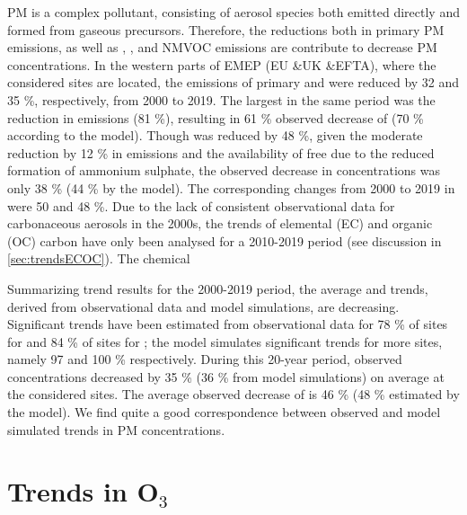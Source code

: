 PM is a complex pollutant, consisting of aerosol species both emitted
directly and formed from gaseous precursors. Therefore, the reductions both in primary PM emissions, as well as \sox, \noii, \nhiii and NMVOC emissions are contribute to decrease PM concentrations. In the western parts of EMEP (EU \&UK \&EFTA), where the considered sites are located, the emissions of primary \PM[10] and \PM[2.5] were reduced by 32 and 35 \%, respectively, from 2000 to 2019. The largest in the same period was the reduction in \sox emissions (81 \%), resulting in 61 \% observed decrease of \soiv (70 \% according to the model). Though \noii was reduced by 48 \%, given the moderate reduction by 12 \% in \nhiii emissions and the availability of free \nhiii due to the reduced formation of ammonium sulphate, the observed decrease in \noiii concentrations was only 38 \% (44 \% by the model). The corresponding changes from 2000 to 2019 in \nhiv were 50 and 48 \%. Due to the lack of consistent observational data for carbonaceous aerosols in the 2000s, the trends of elemental (EC) and organic (OC) carbon have only been analysed for a 2010-2019 period (see discussion in \ref{sec:trendsECOC}). The chemical  

Summarizing trend results for the 2000-2019 period, the average \PM[10] and \PM[2.5] trends, derived from observational data and model simulations, are decreasing. Significant trends have been estimated from observational data for 78 \% of sites for \PM[10] and 84 \% of sites for \PM[2.5]; the model simulates significant trends for more sites, namely 97 and 100 \% respectively. During this 20-year period, observed \PM[10] concentrations decreased by 35 \%  (36 \% from model simulations) on average at the considered sites. The average observed decrease of \PM[2.5] is 46 \%  (48 \% estimated by the model). We find quite a good correspondence between observed and model simulated trends in PM concentrations. 




\section{\label{sec:Trends_O3}Trends in O$_3$ }

